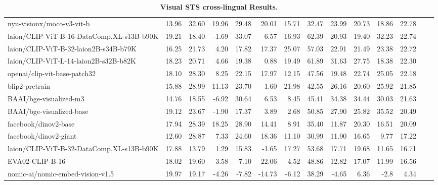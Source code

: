 \begin{table*}
{\begin{tabular}{lrrrrrrrrrrrrr}
nyu-visionx/moco-v3-vit-b &13.96 &32.60 &19.96 &29.48 &20.01 &15.71 &32.47 &23.99 &20.73 &18.86 &22.78 \\
laion/CLIP-ViT-B-16-DataComp.XL-s13B-b90K &19.21 &18.40 &-1.69 &33.07 &6.57 &16.93 &62.39 &20.93 &19.40 &32.23 &22.74 \\
laion/CLIP-ViT-B-32-laion2B-s34B-b79K &16.25 &21.73 &4.20 &17.82 &17.37 &25.07 &57.03 &22.91 &21.49 &23.38 &22.72 \\
laion/CLIP-ViT-L-14-laion2B-s32B-b82K &18.23 &20.71 &4.66 &19.38 &0.88 &19.49 &61.89 &31.63 &27.75 &18.38 &22.30 \\
openai/clip-vit-base-patch32 &18.10 &28.30 &8.25 &22.15 &17.97 &12.15 &47.56 &19.48 &22.74 &25.05 &22.18 \\
blip2-pretrain &15.88 &28.99 &11.13 &23.70 &1.60 &21.98 &42.55 &26.16 &20.60 &25.92 &21.85 \\
BAAI/bge-visualized-m3 &14.76 &18.55 &-6.92 &30.64 &6.53 &8.45 &45.41 &34.38 &34.44 &30.03 &21.63 \\
BAAI/bge-visualized-base &19.12 &23.67 &-1.90 &17.37 &3.89 &2.68 &50.85 &27.90 &25.82 &35.52 &20.49 \\
facebook/dinov2-base &17.94 &28.39 &18.25 &28.90 &14.41 &8.91 &35.40 &11.87 &20.30 &16.51 &20.09 \\
facebook/dinov2-giant &12.60 &28.87 &7.33 &24.60 &18.36 &11.10 &30.99 &11.90 &16.65 &9.77 &17.22 \\
laion/CLIP-ViT-B-32-DataComp.XL-s13B-b90K &17.88 &13.79 &1.29 &15.83 &-1.65 &17.27 &53.68 &17.71 &19.68 &11.65 &16.71 \\
EVA02-CLIP-B-16 &18.02 &19.60 &3.58 &7.10 &22.06 &4.52 &48.86 &12.82 &17.07 &11.99 &16.56 \\
nomic-ai/nomic-embed-vision-v1.5 &19.97 &19.17 &-4.26 &-7.82 &-14.73 &-6.12 &38.29 &-4.65 &6.36 &-2.8 &4.34 \\
\bottomrule
\end{tabular}}
\caption{\textbf{Visual STS cross-lingual Results.}}\label{tab: sts cross}
\end{table*}